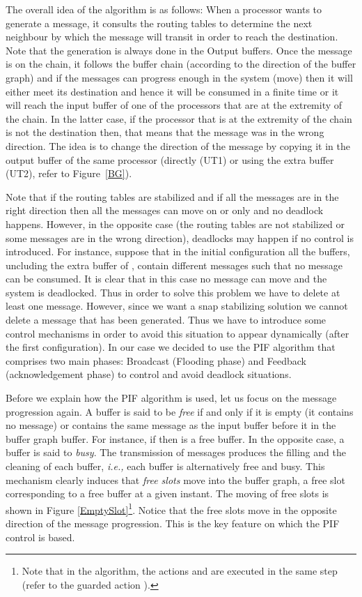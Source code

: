 \documentclass{llncs}
\newcommand{\ie}{\emph{i.e., }}
\begin{document}
The overall idea of the algorithm is as follows: When a processor wants to generate a message, it consults the routing
tables to determine the next neighbour by which the message will transit in order to reach the destination. Note that
the generation is always done in the Output buffers. Once the message is on the chain, it follows the buffer chain
(according to the direction of the buffer graph) and if the messages can progress enough in the system (move) then it
will either meet its destination and hence it will be consumed in a finite time or it will reach the input buffer of
one of the processors that are at the extremity of the chain. In the latter case, if the processor that is at the
extremity of the chain is not the destination then, that means that the message was in the wrong direction. The idea
is to change the direction of the message by copying it in the output buffer of the same processor (directly (UT1) or
using the extra buffer (UT2), refer to Figure~\ref{BG}). 

Note that if the routing tables are stabilized and if all the messages are in the right direction then all the
messages can move on  or  only and no deadlock happens. However, in the opposite case (the routing tables are not stabilized or
some messages are in the wrong direction), deadlocks may happen if no control is introduced. For instance, suppose
that in the initial configuration all the buffers, uncluding the extra buffer of , contain different messages such that 
no message can be consumed. It is clear that in this case no message can move and the system is deadlocked. Thus in order to solve this problem we
have to delete at least one message. However, since we want a snap stabilizing solution we cannot delete a message
that has been generated. Thus we have to introduce some control mechanisms in order to avoid this situation to appear
dynamically (after the first configuration). In our case we decided to use the PIF algorithm that comprises two main
phases: Broadcast (Flooding phase) and Feedback (acknowledgement phase) to control and avoid deadlock situations.

Before we explain how the PIF algorithm is used, let us focus on the message progression again.
A buffer is said to be {\em free} if and only if it is empty (it contains no message) or contains the same message as
the input buffer before it in the buffer graph buffer. For instance, if  then  is a
free buffer. In the opposite case, a buffer is said to {\em busy}.
The transmission of messages produces the filling and the cleaning of each buffer, \ie each buffer is alternatively
free and busy. This mechanism clearly induces that {\em free slots} move into the buffer graph, a free slot
corresponding to a free buffer at a given instant. The moving of free slots is shown in Figure \ref{EmptySlot}\footnote{Note that in the
algorithm, the actions  and  are executed in the same step (refer to the guarded action ).}.
Notice that the free slots move in the opposite direction of the message progression.  This is the key feature on
which the PIF control is based.
\end{document}
